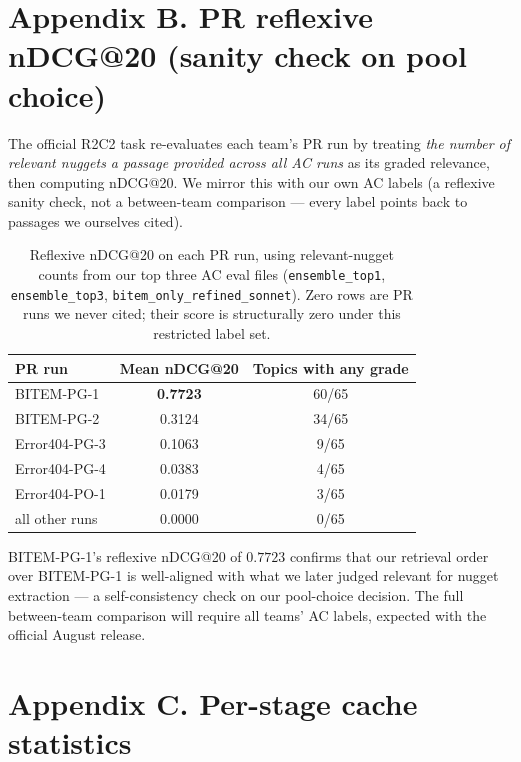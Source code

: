 \documentclass[11pt,a4paper]{article}
\begin{document}
\section*{Appendix B. PR reflexive nDCG@20 (sanity check on pool choice)}

The official R2C2 task re-evaluates each team's PR run by treating
\emph{the number of relevant nuggets a passage provided across all AC
runs} as its graded relevance, then computing nDCG@20. We mirror
this with our own AC labels (a reflexive sanity check, not a
between-team comparison — every label points back to passages we
ourselves cited).

\begin{table}[h]
\centering
\caption{Reflexive nDCG@20 on each PR run, using relevant-nugget
counts from our top three AC eval files (\texttt{ensemble\_top1},
\texttt{ensemble\_top3}, \texttt{bitem\_only\_refined\_sonnet}).
Zero rows are PR runs we never cited; their score is structurally
zero under this restricted label set.}
\begin{tabular}{lcc}
\toprule
PR run & Mean nDCG@20 & Topics with any grade \\
\midrule
BITEM-PG-1     & \textbf{0.7723} & 60/65 \\
BITEM-PG-2     & 0.3124 & 34/65 \\
Error404-PG-3  & 0.1063 & 9/65 \\
Error404-PG-4  & 0.0383 & 4/65 \\
Error404-PO-1  & 0.0179 & 3/65 \\
all other runs & 0.0000 & 0/65 \\
\bottomrule
\end{tabular}
\end{table}

\noindent BITEM-PG-1's reflexive nDCG@20 of $0.7723$ confirms that
our retrieval order over BITEM-PG-1 is well-aligned with what we
later judged relevant for nugget extraction --- a self-consistency
check on our pool-choice decision. The full between-team comparison
will require all teams' AC labels, expected with the official August
release.

\section*{Appendix C. Per-stage cache statistics}
\end{document}
